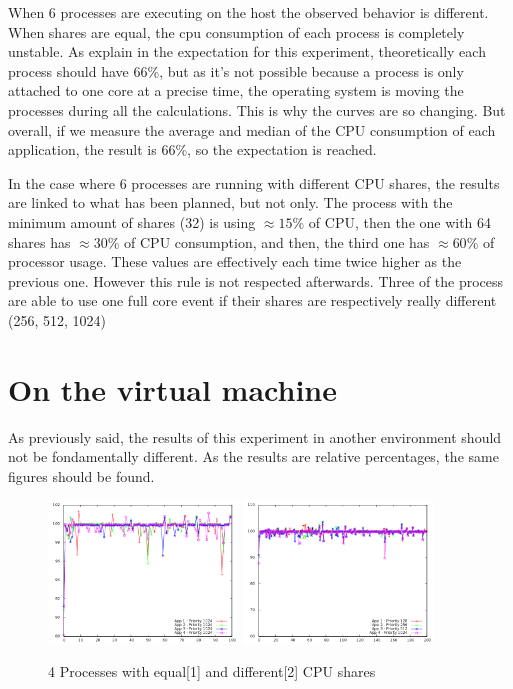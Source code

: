 When 6 processes are executing on the host the observed behavior is different.
When shares are equal, the cpu consumption of each process is completely
unstable.  As explain in the expectation for this experiment, theoretically
each process should have 66\%, but as it's not possible because a process is
only attached to one core at a precise time, the operating system is moving the
processes during all the calculations. This is why the curves are so changing.
But overall, if we measure the average and median of the CPU consumption of
each application, the result is 66\%, so the expectation is reached.

In the case where 6 processes are running with different CPU shares, the
results are linked to what has been planned, but not only. The process with the
minimum amount of shares (32) is using $\approx15\%$ of CPU, then the one with
64 shares has $\approx30\%$ of CPU consumption, and then, the third one has
$\approx60\%$ of processor usage. These values are effectively each time twice
higher as the previous one. However this rule is not respected afterwards. Three
of the process are able to use one full core event if their shares are respectively
really different (256, 512, 1024)

\section{On the virtual machine}

As previously said, the results of this experiment in another environment should
not be fondamentally different. As the results are relative percentages, the
same figures should be found.

\begin{figure}[h!]
\begin{center}
	\includegraphics[width=0.45\textwidth]{./Images/CpuMonitor/vm/4_equalshares.png}
	\includegraphics[width=0.45\textwidth]{./Images/CpuMonitor/vm/4_differentshares.png}
	\caption{4 Processes with equal[1] and different[2] CPU shares}
\end{center}
\end{figure}

